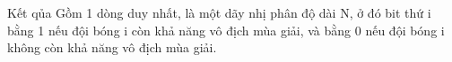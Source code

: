 Kết qủa  
Gồm 1 dòng duy nhất, là một dãy nhị phân độ dài N, ở đó bit thứ i bằng 1 nếu đội bóng i còn khả năng vô địch mùa giải, và bằng 0 nếu đội bóng i không còn khả năng vô địch mùa giải.